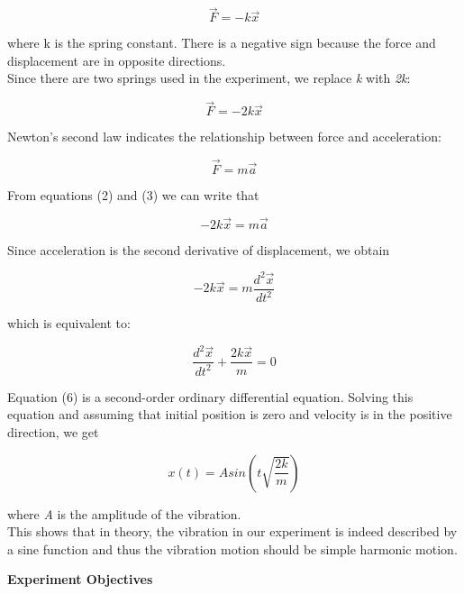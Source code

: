 \documentclass{article}
\begin{document}
\begin{equation}
\vec{F}=-k\vec{x}
\end{equation}

where k is the spring constant. There is a negative sign because the force and displacement are in opposite directions.\\
Since there are two springs used in the experiment, we replace \textit{k} with \textit{2k}:

\begin{equation}
\vec{F}=-2k\vec{x}
\end{equation}

Newton’s second law indicates the relationship between force and acceleration:

\begin{equation}
\vec{F}=m\vec{a}
\end{equation}

From equations (2) and (3) we can write that

\begin{equation}
-2k\vec{x}=m\vec{a}
\end{equation}

Since acceleration is the second derivative of displacement, we obtain

\begin{equation}
-2k\vec{x}=m\frac{d^2\vec{x}}{dt^2}
\end{equation}

which is equivalent to:

\begin{equation}
\frac{d^2\vec{x}}{dt^2}+\frac{2k\vec{x}}{m}=0
\end{equation}

Equation (6) is a second-order ordinary differential equation. Solving this equation and assuming that initial position is zero and velocity is in the positive direction, we get

\begin{equation}
x(t)=Asin(t\sqrt{\frac{2k}{m}})
\end{equation}

where \textit{A} is the amplitude of the vibration.\\
This shows that in theory, the vibration in our experiment is indeed described by a sine function and thus the vibration motion should be simple harmonic motion.

\begin{center}
\large\textbf{Experiment Objectives}
\end{center}
\end{document}
